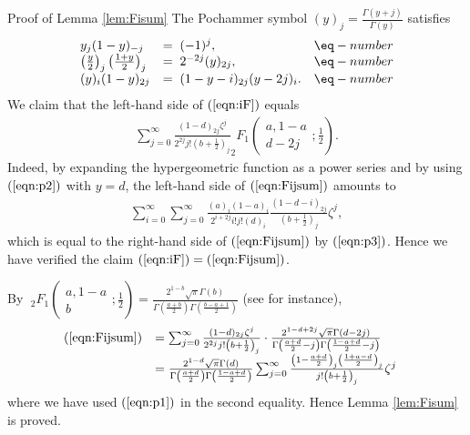 \documentclass{svjour3}
\newenvironment{proof*}[1]{\noindent\textbf{#1\ }}{\hspace*{\fill}$\Box$\medskip}
\begin{document}
\begin{proof*}{Proof of Lemma \ref{lem:Fisum}}
  The Pochammer symbol $(y)_j = \frac{\Gamma (y + j)}{\Gamma (y)}$ satisfies
  \[ \begin{array}{lll}
       y_j (1 - y)_{- j} & = \; (- 1)^j, & \eq-number \label{eqn:p1}\\
       \left( \frac{y}{2} \right)_j \left( \frac{1 + y}{2} \right)_j & = \;
       2^{- 2 j} (y)_{2 j}, & \eq-number \label{eqn:p2}\\
       (y)_i (1 - y)_{2 j} & = \; (1 - y - i)_{2 j} (y - 2 j)_i . & \eq-number
       \label{eqn:p3}
     \end{array} \]
  We claim that the left-hand side of $(\ref{eqn:iF})$ equals
  \begin{eqnarray}
    & \sum_{j = 0}^{\infty} \frac{(1 - d)_{2 j} \zeta^j}{2^{2 j} j! \left( b
    + \frac{1}{2} \right)_j} _2 F_1 \left( \begin{array}{c}
      a, 1 - a\\
      d - 2 j
    \end{array} ; \frac{1}{2} \right) .  \label{eqn:Fijsum} & 
  \end{eqnarray}
  Indeed, by expanding the hypergeometric function as a power series and by
  using $(\ref{eqn:p2})$ with $y = d$, the left-hand side of
  $(\ref{eqn:Fijsum})$ amounts to
  \begin{eqnarray}
    & \sum_{i = 0}^{\infty} \sum_{j = 0}^{\infty} \frac{(a)_i (1 - a)_i}{2^{i
    + 2 j} i!j! (d)_i}  \frac{(1 - d - i)_{2 j}}{\left( b + \frac{1}{2}
    \right)_j} \zeta^j, &  \nonumber
  \end{eqnarray}
  which is equal to the right-hand side of $(\ref{eqn:Fijsum})$ by
  $(\ref{eqn:p3})$. Hence we have verified the claim $(\ref{eqn:iF}) =
  (\ref{eqn:Fijsum})$.
  
  By $\;_2 F_1 \left( \begin{array}{c}
    a, 1 - a\\
    b
  \end{array} ; \frac{1}{2} \right) = \frac{2^{1 - b} \sqrt{\pi} \Gamma
  (b)}{\Gamma \left( \frac{a + b}{2} \right) \Gamma \left( \frac{b - a + 1}{2}
  \right)}$ (see {\cite[Thm. 5.4]{andrews1999special}} for instance),
  \begin{eqnarray}
    & \begin{array}{ll}
      (\ref{eqn:Fijsum}) & = \sum_{j = 0}^{\infty} \frac{(1 - d)_{2 j}
      \zeta^j}{2^{2 j} j! \left( b + \frac{1}{2} \right)_j} \cdot \frac{2^{1 -
      d + 2 j} \sqrt{\pi} \Gamma (d - 2 j)}{\Gamma \left( \frac{a + d}{2} - j
      \right) \Gamma \left( \frac{1 - a + d}{2} - j \right)}\\
      & = \frac{2^{1 - d} \sqrt{\pi} \Gamma (d)}{\Gamma \left( \frac{a +
      d}{2} \right) \Gamma \left( \frac{1 - a + d}{2} \right)} \sum_{j =
      0}^{\infty} \frac{\left( 1 - \frac{a + d}{2} \right)_j \left( \frac{1 +
      a - d}{2} \right)_j}{j! \left( b + \frac{1}{2} \right)_j} \zeta^j
    \end{array} &  \nonumber
  \end{eqnarray}
  where we have used $(\ref{eqn:p1})$ in the second equality. Hence Lemma
  \ref{lem:Fisum} is proved.
\end{proof*}
\end{document}
